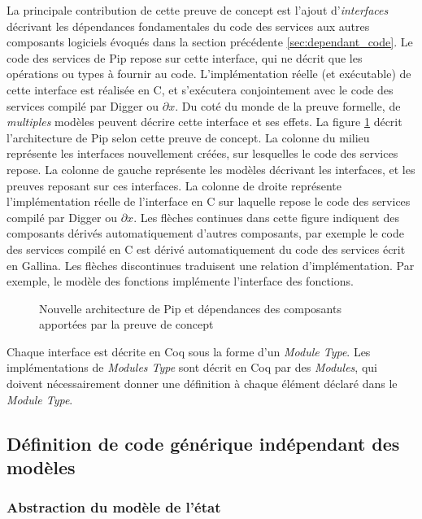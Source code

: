 		La principale contribution de cette preuve de concept est l'ajout d'\emph{interfaces} décrivant les dépendances fondamentales du code des services aux autres composants logiciels évoqués dans la section précédente \ref{sec:dependant_code}. Le code des services de Pip repose sur cette interface, qui ne décrit que les opérations ou types à fournir au code. L'implémentation réelle (et exécutable) de cette interface est réalisée en C, et s'exécutera conjointement avec le code des services compilé par Digger ou $\partial x$. Du coté du monde de la preuve formelle, de \emph{multiples} modèles peuvent décrire cette interface et ses effets. La figure \ref{fig:new_pip_architecture} décrit l'architecture de Pip selon cette preuve de concept. La colonne du milieu représente les interfaces nouvellement créées, sur lesquelles le code des services repose. La colonne de gauche représente les modèles décrivant les interfaces, et les preuves reposant sur ces interfaces. La colonne de droite représente l'implémentation réelle de l'interface en C sur laquelle repose le code des services compilé par Digger ou $\partial x$. Les flèches continues dans cette figure indiquent des composants dérivés automatiquement d'autres composants, par exemple le code des services compilé en C est dérivé automatiquement du code des services écrit en Gallina. Les flèches discontinues traduisent une relation d'implémentation. Par exemple, le modèle des fonctions implémente l'interface des fonctions.

			\begin{figure}[!ht]
				
				\caption{Nouvelle architecture de Pip et dépendances des composants apportées par la preuve de concept}
				\label{fig:new_pip_architecture}
			\end{figure}

			Chaque interface est décrite en Coq sous la forme d'un \emph{Module Type}. Les implémentations de \emph{Modules Type} sont décrit en Coq par des \emph{Modules}, qui doivent nécessairement donner une définition à chaque élément déclaré dans le \emph{Module Type}.

		\subsection{Définition de code générique indépendant des modèles}

			\subsubsection{Abstraction du modèle de l'état}

